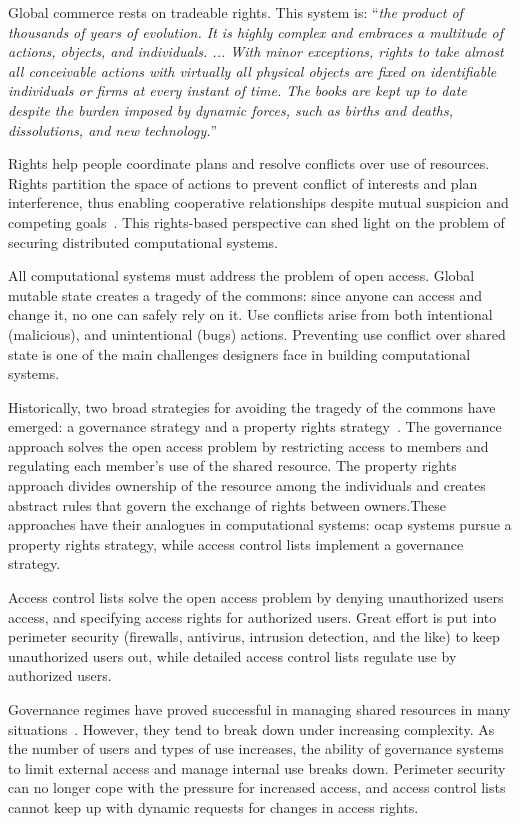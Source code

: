 \documentclass{llncs}
\begin{document}
Global commerce rests on tradeable rights. This system is: ``\emph{the product of thousands of years of evolution. It is highly complex and embraces a multitude of actions, objects, and individuals. ... With minor exceptions, rights to take almost all conceivable actions with virtually all physical objects are fixed on identifiable individuals or firms at every instant of time. The books are kept up to date despite the burden imposed by dynamic forces, such as births and deaths, dissolutions, and new technology.}''~\cite{jensen_specific_1995}

Rights help people coordinate plans and resolve conflicts over use of resources. Rights partition the space of actions to prevent conflict of interests and plan interference, thus enabling cooperative relationships despite mutual suspicion and competing goals~\cite{steiner_essay_1994}. This rights-based perspective can shed light on the problem of securing distributed computational systems.

All computational systems must address the problem of open access. Global mutable state creates a tragedy of the commons: since anyone can access and change it, no one can safely rely on it. Use conflicts arise from both intentional (malicious), and unintentional (bugs) actions. Preventing use conflict over shared state is one of the main challenges designers face in building computational systems.

Historically, two broad strategies for avoiding the tragedy of the commons have emerged: a governance strategy and a property rights strategy~\cite{smith_exclusion_2002}. The governance approach solves the open access problem by restricting access to members and regulating each member's use of the shared resource. The property rights approach divides ownership of the resource among the individuals and creates abstract rules that govern the exchange of rights between owners.These approaches have their analogues in computational systems: ocap systems pursue a property rights strategy, while access control lists implement a governance strategy.

Access control lists solve the open access problem by denying unauthorized users access, and specifying access rights for authorized users. Great effort is put into perimeter security (firewalls, antivirus, intrusion detection, and the like) to keep unauthorized users out, while detailed access control lists regulate use by authorized users.

Governance regimes have proved successful in managing shared resources in many situations~\cite{ostrom_governing_1990}. However, they tend to break down under increasing complexity. As the number of users and types of use increases, the ability of governance systems to limit external access and manage internal use breaks down. Perimeter security can no longer cope with the pressure for increased access, and access control lists cannot keep up with dynamic requests for changes in access rights.
\end{document}
